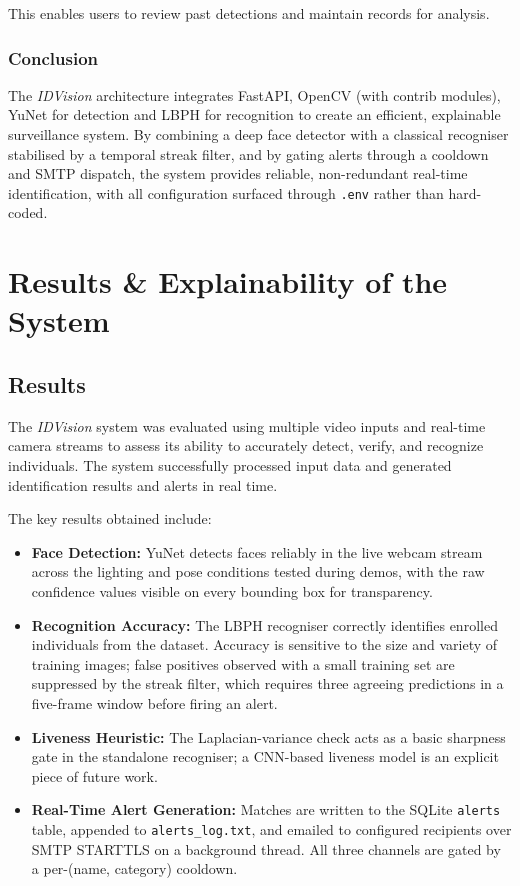 \documentclass[11pt]{report}
\begin{document}
This enables users to review past detections and maintain records for analysis.

\subsection{Conclusion}

The \textit{IDVision} architecture integrates FastAPI, OpenCV (with contrib modules), YuNet for detection and LBPH for recognition to create an efficient, explainable surveillance system. By combining a deep face detector with a classical recogniser stabilised by a temporal streak filter, and by gating alerts through a cooldown and SMTP dispatch, the system provides reliable, non-redundant real-time identification, with all configuration surfaced through \texttt{.env} rather than hard-coded.
\chapter{Results \& Explainability of the System }  
\section{Results}

The \textit{IDVision} system was evaluated using multiple video inputs and real-time camera streams to assess its ability to accurately detect, verify, and recognize individuals. The system successfully processed input data and generated identification results and alerts in real time.

The key results obtained include:

\begin{itemize}
    \item \textbf{Face Detection:} YuNet detects faces reliably in the live webcam stream across the lighting and pose conditions tested during demos, with the raw confidence values visible on every bounding box for transparency.

    \item \textbf{Recognition Accuracy:} The LBPH recogniser correctly identifies enrolled individuals from the dataset. Accuracy is sensitive to the size and variety of training images; false positives observed with a small training set are suppressed by the streak filter, which requires three agreeing predictions in a five-frame window before firing an alert.

    \item \textbf{Liveness Heuristic:} The Laplacian-variance check acts as a basic sharpness gate in the standalone recogniser; a CNN-based liveness model is an explicit piece of future work.

    \item \textbf{Real-Time Alert Generation:} Matches are written to the SQLite \texttt{alerts} table, appended to \texttt{alerts\_log.txt}, and emailed to configured recipients over SMTP STARTTLS on a background thread. All three channels are gated by a per-(name, category) cooldown.
\end{itemize}
\end{document}
